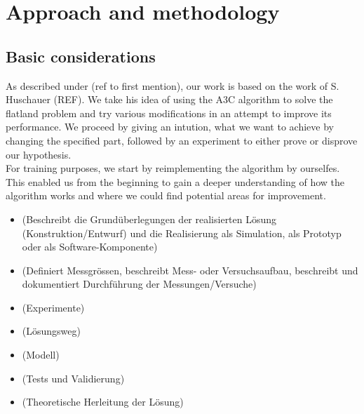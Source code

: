 %
%

\chapter{Approach and methodology}\label{chap.vorgehen}
\section{Basic considerations}\label{basic_cons}
As described under (ref to first mention), our work is based on the work of S. Huschauer (REF). We take his idea of using the A3C algorithm to solve the flatland problem and try various modifications in an attempt to improve its performance. We proceed by giving an intution, what we want to achieve by changing the specified part, followed by an experiment to either prove or disprove our hypothesis.\\
For training purposes, we start by reimplementing the algorithm by ourselfes. This enabled us from the beginning to gain a deeper understanding of how the algorithm works and where we could find potential areas for improvement.


\begin{itemize}
\item (Beschreibt die Grundüberlegungen der realisierten Lösung (Konstruktion/Entwurf) und die Realisierung als Simulation, als Prototyp oder als Software-Komponente)
\item (Definiert Messgrössen, beschreibt Mess- oder Versuchsaufbau, beschreibt und dokumentiert Durchführung der Messungen/Versuche)
\item (Experimente)
\item (Lösungsweg)
\item (Modell)
\item (Tests und Validierung)
\item (Theoretische Herleitung der Lösung)
\end{itemize}



